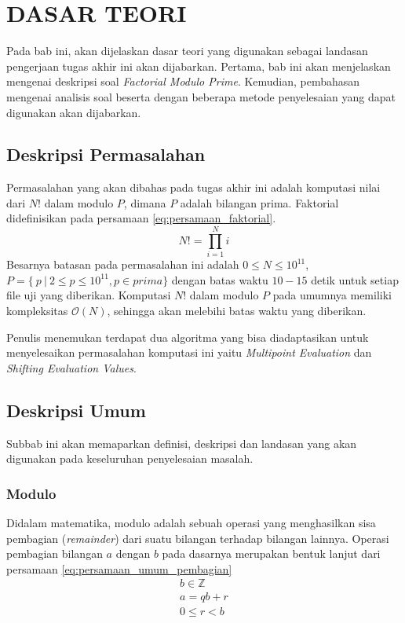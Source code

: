 \chapter {DASAR TEORI}

Pada bab ini, akan dijelaskan dasar teori yang digunakan sebagai landasan pengerjaan tugas akhir ini akan dijabarkan. Pertama, bab ini akan menjelaskan mengenai deskripsi soal \textit{Factorial Modulo Prime}. Kemudian, pembahasan mengenai analisis soal beserta dengan beberapa metode penyelesaian yang dapat digunakan akan dijabarkan.

\section{Deskripsi Permasalahan}
Permasalahan yang akan dibahas pada tugas akhir ini adalah komputasi nilai dari $ N! $ dalam modulo $ P $, dimana $ P $ adalah bilangan prima. Faktorial didefinisikan pada persamaan \eqref{eq:persamaan_faktorial}.
\begin{equation}
	N! = \prod_{i=1}^{N} i
	\label{eq:persamaan_faktorial}
\end{equation}
Besarnya batasan pada permasalahan ini adalah $ 0 \leq N \leq 10^{11} $, $ P = \{\ p\ |\ 2 \leq p \leq 10^{11} , p \in prima \} $ dengan batas waktu $ 10-15 $ detik untuk setiap file uji yang diberikan. Komputasi $ N! $ dalam modulo $ P $ pada umumnya memiliki kompleksitas $ \mathcal{O}{(N)} $, sehingga akan melebihi batas waktu yang diberikan.

Penulis menemukan terdapat dua algoritma yang bisa diadaptasikan untuk menyelesaikan permasalahan komputasi ini yaitu \textit{Multipoint Evaluation} dan \textit{Shifting Evaluation Values}.

\section{Deskripsi Umum}

Subbab ini akan memaparkan definisi, deskripsi dan landasan yang akan digunakan pada keseluruhan penyelesaian masalah.

\subsection{Modulo}
Didalam matematika, modulo adalah sebuah operasi yang menghasilkan sisa pembagian (\textit{remainder}) dari suatu bilangan terhadap bilangan lainnya. Operasi pembagian bilangan $ a $ dengan $ b $ pada dasarnya merupakan bentuk lanjut dari persamaan \eqref{eq:persamaan_umum_pembagian}
\begin{equation}
	\begin{aligned}
		b \in \mathbb {Z}\\
		a=qb+r\\
		0 \leq r < b \\
	\end{aligned}
	\label{eq:persamaan_umum_pembagian}
\end{equation}

